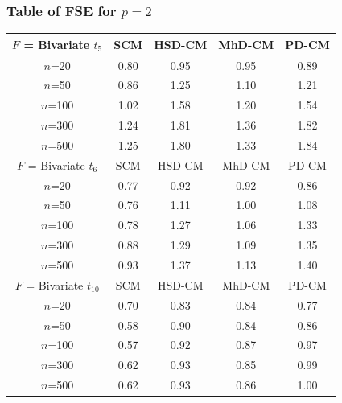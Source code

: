 \documentclass[handout,10pt]{beamer}
\begin{document}
\begin{frame}
\frametitle{Table of FSE for $p=2$}
\begin{table}
\begin{footnotesize}
   \begin{tabular}{c|cccc}
    \hline
    $F$ = Bivariate $t_5$      & SCM  & HSD-CM & MhD-CM & PD-CM \\ \hline
    $n$=20                        & 0.80 & 0.95   & 0.95   & 0.89  \\
    $n$=50                        & 0.86 & 1.25   & 1.10   & 1.21  \\
    $n$=100                       & 1.02 & 1.58   & 1.20   & 1.54  \\
    $n$=300                       & 1.24 & 1.81   & 1.36   & 1.82  \\
    $n$=500                       & 1.25 & 1.80   & 1.33   & 1.84  \\ \hline
    $F$ = Bivariate $t_6$      & SCM  & HSD-CM & MhD-CM & PD-CM \\ \hline
    $n$=20                        & 0.77 & 0.92   & 0.92   & 0.86  \\
    $n$=50                        & 0.76 & 1.11   & 1.00   & 1.08  \\
    $n$=100                       & 0.78 & 1.27   & 1.06   & 1.33  \\
    $n$=300                       & 0.88 & 1.29   & 1.09   & 1.35  \\
    $n$=500                       & 0.93 & 1.37   & 1.13   & 1.40  \\ \hline
    $F$ = Bivariate $t_{10}$ & SCM  & HSD-CM & MhD-CM & PD-CM \\ \hline
    $n$=20                        & 0.70 & 0.83   & 0.84   & 0.77  \\
    $n$=50                        & 0.58 & 0.90   & 0.84   & 0.86  \\
    $n$=100                       & 0.57 & 0.92   & 0.87   & 0.97  \\
    $n$=300                       & 0.62 & 0.93   & 0.85   & 0.99  \\
    $n$=500                       & 0.62 & 0.93   & 0.86   & 1.00  \\ \hline
    \end{tabular}
\end{footnotesize}
\label{table:FSEtable1}
\end{table}
\end{frame}
\end{document}
